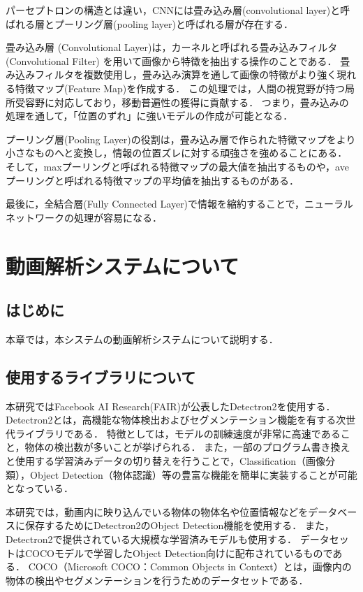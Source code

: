 \documentclass[a4j,12pt,dvipdfmx]{jreport}
\begin{document}
パーセプトロンの構造とは違い，CNNには畳み込み層(convolutional layer)と呼ばれる層とプーリング層(pooling layer)と呼ばれる層が存在する．

畳み込み層 (Convolutional Layer)は，カーネルと呼ばれる畳み込みフィルタ (Convolutional Filter) を用いて画像から特徴を抽出する操作のことである．
畳み込みフィルタを複数使用し，畳み込み演算を通して画像の特徴がより強く現れる特徴マップ(Feature Map)を作成する．
この処理では，人間の視覚野が持つ局所受容野に対応しており，移動普遍性の獲得に貢献する．
つまり，畳み込みの処理を通して，「位置のずれ」に強いモデルの作成が可能となる．

プーリング層(Pooling Layer)の役割は，畳み込み層で作られた特徴マップをより小さなものへと変換し，情報の位置ズレに対する頑強さを強めることにある．
そして，maxプーリングと呼ばれる特徴マップの最大値を抽出するものや，aveプーリングと呼ばれる特徴マップの平均値を抽出するものがある．

最後に，全結合層(Fully Connected Layer)で情報を縮約することで，ニューラルネットワークの処理が容易になる．

\clearpage

\chapter{動画解析システムについて}
\label{sec:system}
\section{はじめに}
本章では，本システムの動画解析システムについて説明する．

\section{使用するライブラリについて}
本研究ではFacebook AI Research(FAIR)が公表したDetectron2を使用する．
Detectron2とは，高機能な物体検出およびセグメンテーション機能を有する次世代ライブラリである\cite{detectron2}．
特徴としては，モデルの訓練速度が非常に高速であること，物体の検出数が多いことが挙げられる．
また，一部のプログラム書き換えと使用する学習済みデータの切り替えを行うことで，Classification（画像分類），Object Detection（物体認識）等の豊富な機能を簡単に実装することが可能となっている．

本研究では，動画内に映り込んでいる物体の物体名や位置情報などをデータベースに保存するためにDetectron2のObject Detection機能を使用する．
また，Detectron2で提供されている大規模な学習済みモデルも使用する．
データセットはCOCOモデルで学習したObject Detection向けに配布されているものである．
COCO（Microsoft COCO：Common Objects in Context）とは，画像内の物体の検出やセグメンテーションを行うためのデータセットである\cite{coco}．
\end{document}
